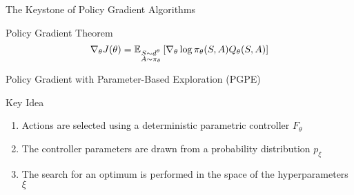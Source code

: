 \begin{frame}{The Keystone of Policy Gradient Algorithms}
	
	\begin{alertblock}{Policy Gradient Theorem}
		\begin{equation*}
			\nabla_\theta J(\theta) =
			\E[\substack{S \sim d^\theta\\A \sim \pi_\theta}]{\nabla_\theta\log
			\pi_\theta(S,A) Q_{\theta}(S, A)}
		\end{equation*}
	\end{alertblock}
	
	
\end{frame}

\begin{frame}{Policy Gradient with Parameter-Based Exploration (PGPE)}
	\begin{block}{Key Idea}
		\begin{enumerate}
			\item<+-> Actions are selected using a deterministic parametric controller $F_\theta$
			\item<+-> The controller parameters are drawn from a probability distribution $p_\xi$
			\item<+-> The search for an optimum is performed in the space of the hyperparameters $\xi$
		\end{enumerate}
	\end{block}
	
\end{frame}


